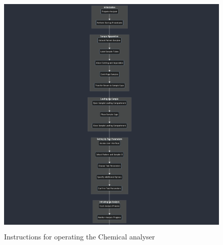 \documentclass[
  11pt,
  letterpaper,
  DIV=11,
  numbers=noendperiod]{scrreprt}
\begin{document}
\begin{figure}[H]

{\centering \includegraphics[width=5.5in,height=4.71875in]{Beyond the Sterile Walls e0cff5645ec24545a8c247940fff8e84/Untitled 7.png}

}

\caption{Instructions for operating the Chemical analyser}

\end{figure}%
\end{document}
